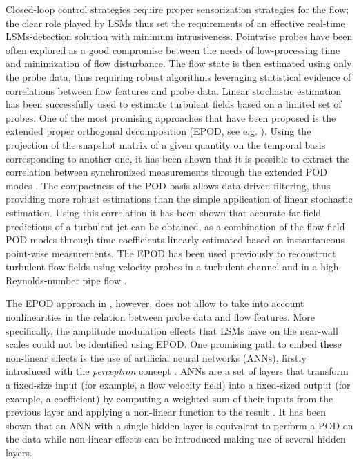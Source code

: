 Closed-loop control strategies require proper sensorization strategies for the flow; the clear role played by LSMs thus set the requirements of an effective real-time LSMs-detection solution with minimum intrusiveness.
Pointwise probes have been often explored as a good compromise between the needs of low-processing time and minimization of flow disturbance.
The flow state is then estimated using only the probe data, thus requiring robust algorithms leveraging statistical evidence of correlations between flow features and probe data.
Linear stochastic estimation \citep{adrian1996stochastic} has been successfully used to estimate turbulent fields \citep{tinney2006spectral,tinney2008low,baars2016spectral,suzuki2017estimation,illingworth2018estimating,encinar2018reconstructing} based on a limited set of probes.
One of the most promising approaches that have been proposed is the extended proper orthogonal decomposition (EPOD, see e.g. \citet{boree2003extended}).
Using the projection of the snapshot matrix of a given quantity on the temporal basis corresponding to another one, it has been shown that it is possible to extract the correlation between synchronized measurements through the extended POD modes \citep{boree2003extended}.
The compactness of the POD basis allows data-driven filtering, thus providing more robust estimations than the simple application of linear stochastic estimation. Using this correlation it has been shown that accurate far-field predictions of a turbulent jet can be obtained, \citep{tinney2008low} as a combination of the flow-field POD modes through time coefficients linearly-estimated based on instantaneous point-wise measurements.
The EPOD has been used previously to reconstruct turbulent flow fields using velocity probes in a turbulent channel \citep{discetti2018estimation} and in a high-Reynolds-number pipe flow \citep{discetti2019characterization}.

The EPOD approach in \citet{discetti2018estimation}, however, does not allow to take into account nonlinearities in the relation between probe data and flow features.
More specifically, the amplitude modulation effects that LSMs have on the near-wall scales \citep{hutchins2007large,mathis2009large} could not be identified using EPOD.
One promising path to embed \textcolor{black}{these} non-linear effects is the use of artificial neural networks (ANNs), firstly introduced with the \textit{perceptron} concept \citep{rosenblatt1958perceptron}.
ANNs are a set of layers that transform a fixed-size input (for example, a flow velocity field) into a fixed-sized output (for example, a coefficient) by computing a weighted sum of their inputs from the previous layer and applying a non-linear function to the result \citep{lecun2015deep}.
It has been shown that an ANN with a single hidden layer is equivalent to perform a POD on the data \citep{baldi1989neural} while non-linear effects can be introduced making use of several hidden layers.

